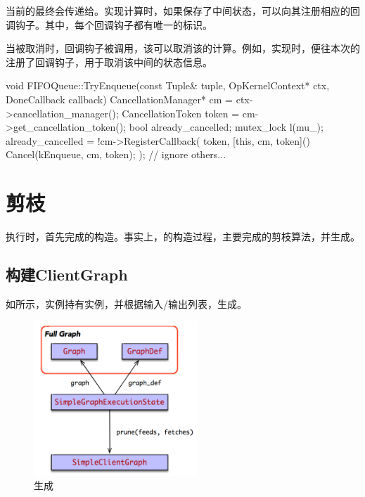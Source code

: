 \begin{content}
当前的最终会传递给。实现计算时，如果保存了中间状态，可以向其注册相应的回调钩子。其中，每个回调钩子都有唯一的标识。

当被取消时，回调钩子被调用，该可以取消该的计算。例如，实现时，便往本次的注册了回调钩子，用于取消该中间的状态信息。

\begin{leftbar}
\begin{c++}
void FIFOQueue::TryEnqueue(const Tuple& tuple, OpKernelContext* ctx,
                           DoneCallback callback) {
  CancellationManager* cm = ctx->cancellation_manager();
  CancellationToken token = cm->get_cancellation_token();
  bool already_cancelled;
  {
    mutex_lock l(mu_);
    already_cancelled = !cm->RegisterCallback(
        token, [this, cm, token]() { Cancel(kEnqueue, cm, token); });
  }
  // ignore others...
}
\end{c++}
\end{leftbar}


\section{剪枝}
\label{sec:graph-operation-prune}

执行时，首先完成的构造。事实上，的构造过程，主要完成的剪枝算法，并生成。

\subsection{构建ClientGraph}

如所示，实例持有实例，并根据输入/输出列表，生成。

\begin{figure}[H]
\centering
\includegraphics[width=0.55\textwidth]{figures/local-simple-graph-execution-state.png}
\caption{生成}
 \label{fig:local-simple-graph-execution-state}
\end{figure}


\end{content}
